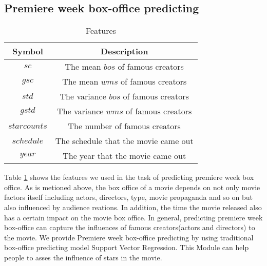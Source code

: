 \label{sec:predict}
\subsection{Premiere week box-office predicting}
\begin{table}[!htb]
  \centering
\begin{tabular}{|c|c|}
\hline
Symbol&Description\\
\hline
$sc$ &The mean $bos$ of famous creators\\
\hline
$gsc$&The mean $wms$ of famous creators\\
\hline
$std$&The variance $bos$ of famous creators\\
\hline
$gstd$&The variance $wms$ of famous creators\\
\hline
$starcounts$& The number of famous creators\\
\hline
$schedule$ & The schedule that the movie came out\\
\hline
$year$ & The year that the movie came out\\
\hline
\end{tabular}
  \caption{Features}
\label{tab:feature}
\end{table}
\par Table \ref{tab:feature} shows the features we used in the task of predicting premiere week box office. As is metioned above, the box office of a movie depends on not only movie factors itself including actors, directors, type, movie propaganda and so on but also influenced by audience reations. In addition, the time the movie released also has a certain impact on the movie box office. In general, predicting premiere week box-office can capture the influences of famous creators(actors and directors) to the movie. We provide Premiere week box-office predicting by using traditional box-office predicting model Support Vector Regression. This Module can help people to asses the influence of stars in the movie.

